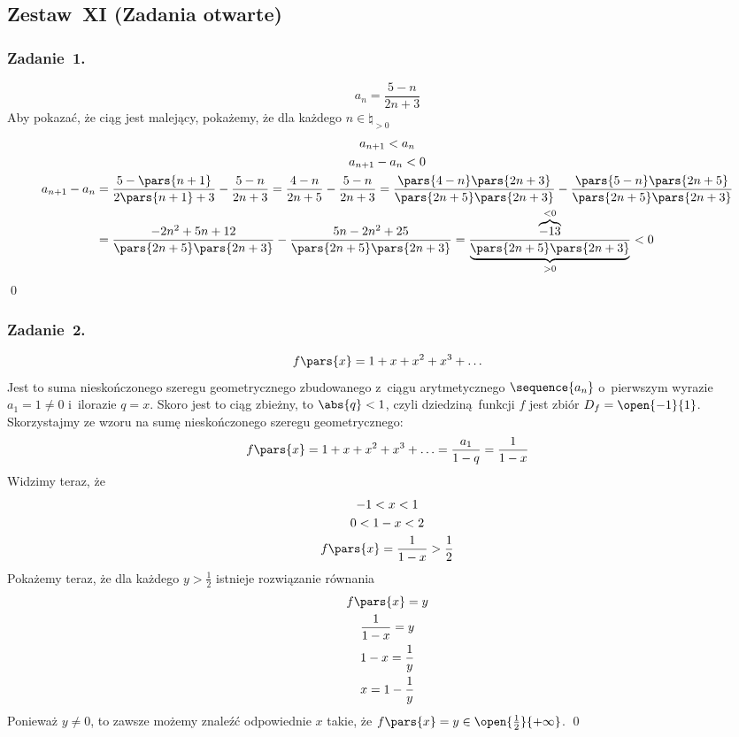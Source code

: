 \subsection*{Zestaw~XI (Zadania otwarte)}
\subsubsection*{Zadanie~1.}
\begin{equation*}
    a_n = \frac{5 - n}{2n + 3}
\end{equation*}
Aby pokazać, że ciąg jest malejący, pokażemy, że dla każdego \(n \in \natural_{> 0}\)
\begin{gather*}
    a_{n + 1} < a_n\\
    a_{n + 1} - a_n < 0\\
    \begin{split}
        a_{n + 1} - a_n
            &= \frac{5 - \pars{n + 1}}{2\pars{n + 1} + 3} - \frac{5 - n}{2n + 3}
            = \frac{4 - n}{2n + 5} - \frac{5 - n}{2n + 3}
            = \frac{\pars{4 - n}\pars{2n + 3}}{\pars{2n + 5}\pars{2n + 3}} - \frac{\pars{5 - n}\pars{2n + 5}}{\pars{2n + 5}\pars{2n + 3}}\\
            &= \frac{-2n^2 + 5n + 12}{\pars{2n + 5}\pars{2n + 3}} - \frac{5n - 2n^2 + 25}{\pars{2n + 5}\pars{2n + 3}}
            = \frac{\overbrace{-13}^{< 0}}{\underbrace{\pars{2n + 5}\pars{2n + 3}}_{> 0}} < 0
    \end{split}
\end{gather*}
\qed
\subsubsection*{Zadanie~2.}
\begin{equation*}
    f\pars{x} = 1 + x + x^2 + x^3 + \ldots
\end{equation*}
Jest to suma nieskończonego szeregu geometrycznego zbudowanego z~ciągu arytmetycznego \(\sequence{a_n}\) o~pierwszym wyrazie \(a_1 = 1 \neq 0\) i~ilorazie \(q = x\). Skoro jest to ciąg zbieżny, to \(\abs{q} < 1\), czyli dziedziną funkcji \(f\) jest zbiór \(D_f = \open{-1}{1}\). Skorzystajmy ze wzoru na sumę nieskończonego szeregu geometrycznego:
\begin{equation*}
    f\pars{x} = 1 + x + x^2 + x^3 + \ldots = \frac{a_1}{1 - q} = \frac{1}{1 - x}
\end{equation*}
Widzimy teraz, że
\begin{gather*}
    -1 < x < 1\\
    0 < 1 - x < 2\\
    f\pars{x} = \frac{1}{1 - x} > \frac{1}{2}
\end{gather*}
Pokażemy teraz, że dla każdego \(y > \frac{1}{2}\) istnieje rozwiązanie równania
\begin{gather*}
    f\pars{x} = y\\
    \frac{1}{1 - x} = y\\
    1 - x = \frac{1}{y}\\
    x = 1 - \frac{1}{y}
\end{gather*}
Ponieważ \(y \neq 0\), to zawsze możemy znaleźć odpowiednie \(x\) takie, że \(f\pars{x} = y \in \open{\frac{1}{2}}{+\infty}\).
\qed
